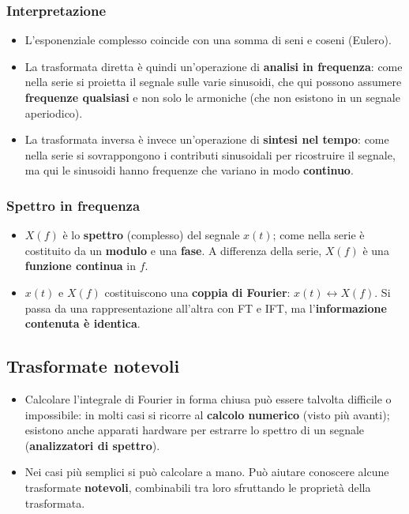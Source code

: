 \documentclass[12pt, a4paper]{article}
\begin{document}
\subsubsection{Interpretazione}
\begin{itemize}
    \item L'esponenziale complesso coincide con una somma di seni e coseni (Eulero).
    \item La trasformata diretta è quindi un'operazione di \textbf{analisi in frequenza}: come nella serie si proietta il segnale sulle varie sinusoidi, che qui possono assumere \textbf{frequenze qualsiasi} e non solo le armoniche (che non esistono in un segnale aperiodico).
    \item La trasformata inversa è invece un'operazione di \textbf{sintesi nel tempo}: come nella serie si sovrappongono i contributi sinusoidali per ricostruire il segnale, ma qui le sinusoidi hanno frequenze che variano in modo \textbf{continuo}.
\end{itemize}

\subsubsection{Spettro in frequenza}
\begin{itemize}
    \item $X(f)$ è lo \textbf{spettro} (complesso) del segnale $x(t)$; come nella serie è costituito da un \textbf{modulo} e una \textbf{fase}. A differenza della serie, $X(f)$ è una \textbf{funzione continua} in $f$.
    \item $x(t)$ e $X(f)$ costituiscono una \textbf{coppia di Fourier}: $x(t)\longleftrightarrow X(f)$. Si passa da una rappresentazione all'altra con FT e IFT, ma l'\textbf{informazione contenuta è identica}.
\end{itemize}

\subsection{Trasformate notevoli}
\begin{itemize}
    \item Calcolare l'integrale di Fourier in forma chiusa può essere talvolta difficile o impossibile: in molti casi si ricorre al \textbf{calcolo numerico} (visto più avanti); esistono anche apparati hardware per estrarre lo spettro di un segnale (\textbf{analizzatori di spettro}).
    \item Nei casi più semplici si può calcolare a mano. Può aiutare conoscere alcune trasformate \textbf{notevoli}, combinabili tra loro sfruttando le proprietà della trasformata.
\end{itemize}
\end{document}
